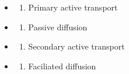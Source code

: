 \documentclass[
]{book}
\providecommand{\tightlist}{%
  \setlength{\itemsep}{0pt}\setlength{\parskip}{0pt}}
\begin{document}
\begin{itemize}
\tightlist
\item
  \begin{enumerate}
  \def\labelenumi{(\Alph{enumi})}
  \tightlist
  \item
    Primary active transport\\
  \end{enumerate}
\item
  \begin{enumerate}
  \def\labelenumi{(\Alph{enumi})}
  \setcounter{enumi}{1}
  \tightlist
  \item
    Passive diffusion\\
  \end{enumerate}
\item
  \begin{enumerate}
  \def\labelenumi{(\Alph{enumi})}
  \setcounter{enumi}{2}
  \tightlist
  \item
    Secondary active transport\\
  \end{enumerate}
\item
  \begin{enumerate}
  \def\labelenumi{(\Alph{enumi})}
  \setcounter{enumi}{3}
  \tightlist
  \item
    Faciliated diffusion
  \end{enumerate}
\end{itemize}

  
\end{document}
